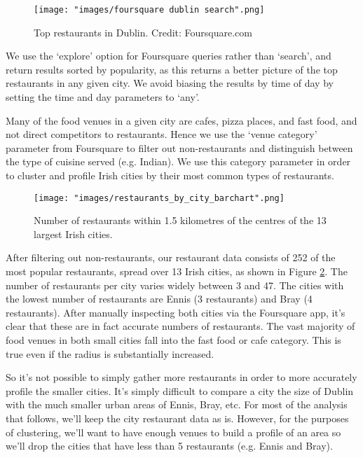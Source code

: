 \documentclass[a4paper,11pt]{article}
\begin{document}
\begin{figure}[htb]
   \centering
   \texttt{[image: "images/foursquare dublin search".png]}
      \caption{Top restaurants in Dublin. Credit: Foursquare.com}
      \label{fig:dublin foursquare}
\end{figure}

We use the `explore' option for Foursquare queries rather than `search', and return results sorted by popularity, as this returns a better picture of the top restaurants in any given city. We avoid biasing the results by time of day by setting the time and day parameters to `any'.


Many of the food venues in a given city are cafes, pizza places, and fast food, and not direct competitors to restaurants. Hence we use the `venue category' parameter from Foursquare to filter out non-restaurants and distinguish between the type of cuisine served (e.g. Indian). We use this category parameter in order to cluster and profile Irish cities by their most common types of restaurants.

\begin{figure}[htb]
   \centering
   \texttt{[image: "images/restaurants\_by\_city\_barchart".png]}
      \caption{Number of restaurants within 1.5 kilometres of the centres of the 13 largest Irish cities. }
      \label{fig:restaurants}
\end{figure}

After filtering out non-restaurants, our restaurant data consists of 252 of the most popular restaurants, spread over 13 Irish cities, as shown in Figure \ref{fig:restaurants}. The number of restaurants per city varies widely between 3 and 47. The cities with the lowest number of restaurants are Ennis (3 restaurants) and Bray (4 restaurants). After manually inspecting both cities via the Foursquare app, it's clear that these are in fact accurate numbers of restaurants. The vast majority of food venues in both small cities fall into the fast food or cafe category. This is true even if the radius is substantially increased.

So it's not possible to simply gather more restaurants in order to more accurately profile the smaller cities. It's simply difficult to compare a city the size of Dublin with the much smaller urban areas of Ennis, Bray, etc. For most of the analysis that follows, we'll keep the city restaurant data as is. However, for the purposes of clustering, we'll want to have enough venues to build a profile of an area so we'll drop the cities that have less than 5 restaurants (e.g. Ennis and Bray).
\end{document}
